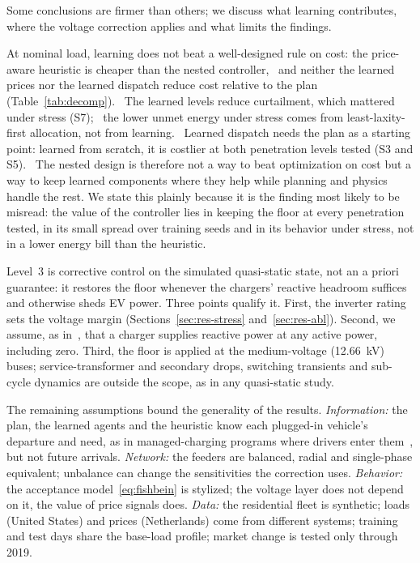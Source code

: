 Some conclusions are firmer than others; we discuss what learning
contributes, where the voltage correction applies and what limits the findings.

At nominal load, learning does not beat a well-designed rule on cost: the
price-aware heuristic is cheaper than the nested controller,%
\ and neither the learned prices nor the learned dispatch reduce cost relative
to the plan (Table~\ref{tab:decomp}).%
\ The learned levels reduce curtailment, which mattered under stress
(S7);%
\ the lower unmet energy under stress comes from least-laxity-first
allocation, not from learning.%
\ Learned dispatch needs the plan as a starting point: learned from scratch,
it is costlier at both penetration levels tested (S3 and
S5).%
\ The nested design is therefore not a way to beat optimization on cost but a
way to keep learned components where they help while planning and physics
handle the rest. We state this plainly because it is the finding most likely
to be misread: the value of the controller lies in keeping the floor at every
penetration tested, in its small spread over training seeds and in its
behavior under stress, not in a lower energy bill than the heuristic.

Level~3 is corrective control on the simulated quasi-static state, not an a
priori guarantee: it restores the floor whenever the chargers' reactive
headroom suffices and otherwise sheds EV power. Three points qualify it.
First, the inverter rating sets the voltage margin
(Sections~\ref{sec:res-stress} and~\ref{sec:res-abl}). Second, we assume, as in~\cite{leemput2015},
that a charger supplies reactive power at any active power, including zero.
Third, the floor is applied at the medium-voltage (\SI{12.66}{kV}) buses;
service-transformer and secondary drops, switching transients and sub-cycle
dynamics are outside the scope, as in any quasi-static study.

The remaining assumptions bound the generality of the results.
\emph{Information:} the plan, the learned agents and the heuristic know each
plugged-in vehicle's departure and need, as in managed-charging programs where
drivers enter them~\cite{lee2019acn}, but not future arrivals.
\emph{Network:} the feeders are balanced, radial and single-phase equivalent;
unbalance can change the sensitivities the correction uses.
\emph{Behavior:} the acceptance model~\eqref{eq:fishbein} is stylized; the
voltage layer does not depend on it, the value of price signals does.
\emph{Data:} the residential fleet is synthetic; loads (United States) and
prices (Netherlands) come from different systems; training and test days share
the base-load profile; market change is tested only through 2019.
